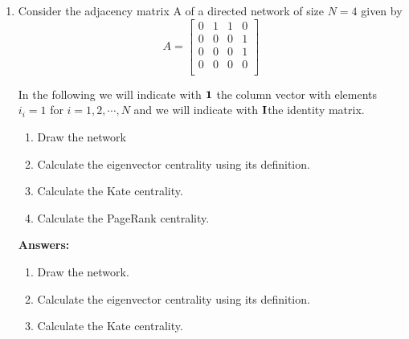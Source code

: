 \documentclass{amsart}
\theoremstyle{definition}
\theoremstyle{remark}
\numberwithin{equation}{section}
\begin{document}
\clearpage
\begin{enumerate}

\item Consider the adjacency matrix A of a directed network of size $N = 4$ given by \vspace{0.2cm}
\begin{equation*}
{A}  = \left\lbrack\begin{array}{cccc}
0 & 1 & 1 & 0 \\
0 & 0 & 0 & 1 \\
0 & 0 & 0 & 1 \\
0 & 0 & 0 & 0 \\
\end{array}\right\rbrack
\end{equation*}

\vspace{0.2cm}
In the following we will indicate with ${\bf 1}$ the column vector with elements $i_i = 1$ for $i = 1, 2, \cdots, N$ and we will indicate with ${\bf I}$the identity matrix. \vspace{0.2cm}
\begin{enumerate}
\item Draw the network
\item Calculate the eigenvector centrality using its definition.
\item Calculate the Kate centrality.
\item Calculate the PageRank centrality. 
\end{enumerate}
\vspace{1cm}

\textbf{Answers:}

\begin{enumerate}
\item Draw the network. \vspace{0.2cm}

\vspace{0.2cm}
\item Calculate the eigenvector centrality using its definition. \vspace{0.2cm}

\vspace{0.2cm}
\item Calculate the Kate centrality. \vspace{0.2cm}


\end{enumerate}
\end{enumerate}
\end{document}
